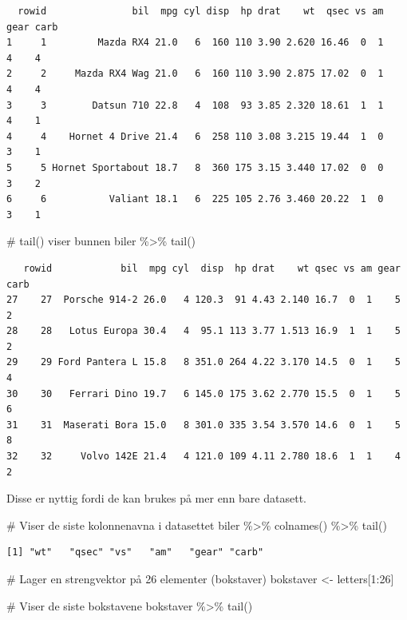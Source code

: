 \documentclass[
  letterpaper,
  DIV=11,
  numbers=noendperiod]{scrreprt}
\newenvironment{Shaded}{\begin{snugshade}}{\end{snugshade}}
\newcommand{\CommentTok}[1]{\textcolor[rgb]{0.37,0.37,0.37}{#1}}
\newcommand{\DecValTok}[1]{\textcolor[rgb]{0.68,0.00,0.00}{#1}}
\newcommand{\FunctionTok}[1]{\textcolor[rgb]{0.28,0.35,0.67}{#1}}
\newcommand{\NormalTok}[1]{\textcolor[rgb]{0.00,0.23,0.31}{#1}}
\newcommand{\OtherTok}[1]{\textcolor[rgb]{0.00,0.23,0.31}{#1}}
\newcommand{\SpecialCharTok}[1]{\textcolor[rgb]{0.37,0.37,0.37}{#1}}
\begin{document}
\begin{verbatim}
  rowid               bil  mpg cyl disp  hp drat    wt  qsec vs am gear carb
1     1         Mazda RX4 21.0   6  160 110 3.90 2.620 16.46  0  1    4    4
2     2     Mazda RX4 Wag 21.0   6  160 110 3.90 2.875 17.02  0  1    4    4
3     3        Datsun 710 22.8   4  108  93 3.85 2.320 18.61  1  1    4    1
4     4    Hornet 4 Drive 21.4   6  258 110 3.08 3.215 19.44  1  0    3    1
5     5 Hornet Sportabout 18.7   8  360 175 3.15 3.440 17.02  0  0    3    2
6     6           Valiant 18.1   6  225 105 2.76 3.460 20.22  1  0    3    1
\end{verbatim}

\begin{Shaded}
\begin{Highlighting}[]
\CommentTok{\# \textasciigrave{}tail()\textasciigrave{} viser bunnen}
\NormalTok{biler }\SpecialCharTok{\%\textgreater{}\%} \FunctionTok{tail}\NormalTok{()}
\end{Highlighting}
\end{Shaded}

\begin{verbatim}
   rowid            bil  mpg cyl  disp  hp drat    wt qsec vs am gear carb
27    27  Porsche 914-2 26.0   4 120.3  91 4.43 2.140 16.7  0  1    5    2
28    28   Lotus Europa 30.4   4  95.1 113 3.77 1.513 16.9  1  1    5    2
29    29 Ford Pantera L 15.8   8 351.0 264 4.22 3.170 14.5  0  1    5    4
30    30   Ferrari Dino 19.7   6 145.0 175 3.62 2.770 15.5  0  1    5    6
31    31  Maserati Bora 15.0   8 301.0 335 3.54 3.570 14.6  0  1    5    8
32    32     Volvo 142E 21.4   4 121.0 109 4.11 2.780 18.6  1  1    4    2
\end{verbatim}

Disse er nyttig fordi de kan brukes på mer enn bare datasett.

\begin{Shaded}
\begin{Highlighting}[]
\CommentTok{\# Viser de siste kolonnenavna i datasettet}
\NormalTok{biler }\SpecialCharTok{\%\textgreater{}\%} 
  \FunctionTok{colnames}\NormalTok{() }\SpecialCharTok{\%\textgreater{}\%} 
  \FunctionTok{tail}\NormalTok{()}
\end{Highlighting}
\end{Shaded}

\begin{verbatim}
[1] "wt"   "qsec" "vs"   "am"   "gear" "carb"
\end{verbatim}

\begin{Shaded}
\begin{Highlighting}[]
\CommentTok{\# Lager en strengvektor på 26 elementer (bokstaver)}
\NormalTok{bokstaver }\OtherTok{\textless{}{-}}\NormalTok{ letters[}\DecValTok{1}\SpecialCharTok{:}\DecValTok{26}\NormalTok{]}

\CommentTok{\# Viser de siste bokstavene}
\NormalTok{bokstaver }\SpecialCharTok{\%\textgreater{}\%} \FunctionTok{tail}\NormalTok{()}
\end{Highlighting}
\end{Shaded}
\end{document}

